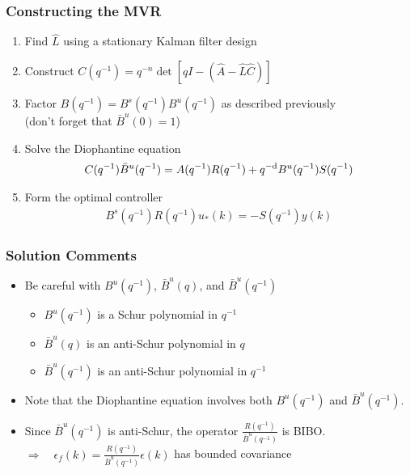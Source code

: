 \begin{frame}
    \frametitle{Constructing the MVR}

    \begin{enumerate}
        \item
        Find $\hat{L}$ using a stationary Kalman filter design

        \item
        Construct $C(q^{-1}) = q^{-n} \det[qI - (\hat{A} - \hat{L}\hat{C})]$

        \item
        Factor $B(q^{-1}) = B^s(q^{-1}) B^u(q^{-1})$ as described previously \\
        (don't forget that $\bar{B}^u(0) = 1$)

        \item
        Solve the Diophantine equation
        \begin{align*}
            C(q^{-1}) \bar{B}^u(q^{-1}) = A(q^{-1}) R(q^{-1}) + q^{-\textrm{d}} B^u(q^{-1}) S(q^{-1})
        \end{align*}

        \item
        Form the optimal controller
        \begin{align*}
            B^s(q^{-1}) R(q^{-1}) u_*(k) = - S(q^{-1}) y(k)
        \end{align*}
    \end{enumerate}
\end{frame}

\begin{frame}
    \frametitle{Solution Comments}

    \begin{itemize}
        \item
        Be careful with $B^u(q^{-1})$, $\bar{B}^u(q)$, and $\bar{B}^u(q^{-1})$
        \pause

        \begin{itemize}
            \item
            $B^u(q^{-1})$ is a Schur polynomial in $q^{-1}$
            \pause

            \item
            $\bar{B}^u(q)$ is an anti-Schur polynomial in $q$
            \pause

            \item
            $\bar{B}^u(q^{-1})$ is an anti-Schur polynomial in $q^{-1}$
        \end{itemize}
        \pause

        \item
        Note that the Diophantine equation involves both $B^u(q^{-1})$ and $\bar{B}^u(q^{-1})$.
        \pause

        \item
        Since $\bar{B}^u(q^{-1})$ is anti-Schur, the operator $\displaystyle{\frac{R(q^{-1})}{\bar{B}^u(q^{-1})}}$ is BIBO.
        \paused
        $\displaystyle{\Rightarrow \quad \epsilon_f(k) = \frac{R(q^{-1})}{\bar{B}^u(q^{-1})} \epsilon(k)}$ has bounded covariance

    \end{itemize}
\end{frame}

